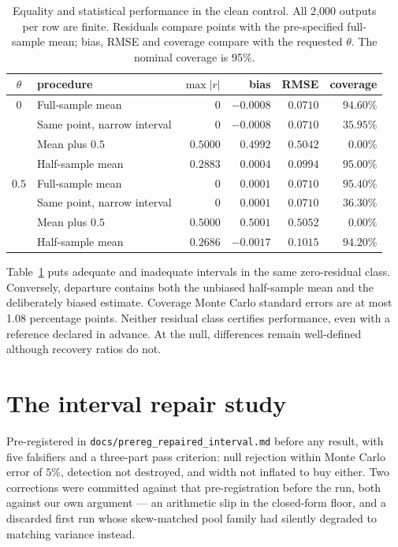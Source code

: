 \begin{table}[htbp]
\centering\small
\caption{Equality and statistical performance in the clean control. All
2{,}000 outputs per row are finite. Residuals compare points with the
pre-specified full-sample mean; bias, RMSE and coverage compare with the
requested $\theta$. The nominal coverage is 95\%.}
\label{tab:cleancontrol}
\begin{tabular}{@{}clrrrr@{}}
\toprule
$\theta$ & procedure & $\max|r|$ & bias & RMSE & coverage \\
\midrule
$0$ & Full-sample mean & $0$ & $-0.0008$ & $0.0710$ & $94.60\%$ \\
 & Same point, narrow interval & $0$ & $-0.0008$ & $0.0710$ & $35.95\%$ \\
 & Mean plus $0.5$ & $0.5000$ & $0.4992$ & $0.5042$ & $0.00\%$ \\
 & Half-sample mean & $0.2883$ & $0.0004$ & $0.0994$ & $95.00\%$ \\
\midrule
$0.5$ & Full-sample mean & $0$ & $0.0001$ & $0.0710$ & $95.40\%$ \\
 & Same point, narrow interval & $0$ & $0.0001$ & $0.0710$ & $36.30\%$ \\
 & Mean plus $0.5$ & $0.5000$ & $0.5001$ & $0.5052$ & $0.00\%$ \\
 & Half-sample mean & $0.2686$ & $-0.0017$ & $0.1015$ & $94.20\%$ \\
\bottomrule
\end{tabular}
\end{table}

Table~\ref{tab:cleancontrol} puts adequate and inadequate intervals in the same
zero-residual class. Conversely, departure contains both the unbiased
half-sample mean and the deliberately biased estimate. Coverage Monte Carlo
standard errors are at most 1.08 percentage points. Neither residual class
certifies performance, even with a reference declared in advance. At the
null, differences remain well-defined although recovery ratios do not.



\section{The interval repair study}
\label{app:repair}

Pre-registered in \texttt{docs/prereg\_repaired\_interval.md} before any result,
with five falsifiers and a three-part pass criterion: null rejection within
Monte Carlo error of $5\%$, detection not destroyed, and width not inflated to
buy either. Two corrections were committed against that pre-registration before
the run, both against our own argument --- an arithmetic slip in the closed-form
floor, and a discarded first run whose skew-matched pool family had silently
degraded to matching variance instead.

